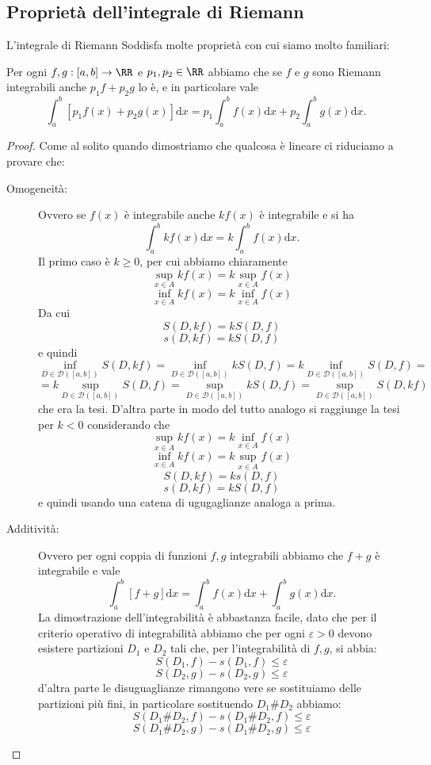 \documentclass[11pt]{scrartcl}
\newcommand{\dif}{\text{d}}
\begin{document}
	\subsection{Proprietà dell'integrale di Riemann}
	L'integrale di Riemann Soddisfa molte proprietà con cui siamo molto familiari:
	\begin{lemma}
		Per ogni $f,g:[a,b]\to\RR$ e $p_1,p_2\in \RR$ abbiamo che se $f$ e $g$ sono Riemann integrabili anche $p_1f+p_2g$ lo è, e in particolare vale
		$$\int_a^b\left[p_1f(x)+p_2g(x)\right]\dif x=p_1\int_a^bf(x)\dif x+p_2\int_a^b g(x)\dif x.$$
	\end{lemma}
	\begin{proof}
		Come al solito quando dimostriamo che qualcosa è lineare ci riduciamo a provare che:
		\begin{description}
			\item[Omogeneità:] Ovvero se $f(x)$ è integrabile anche $kf(x)$ è integrabile e si ha
			$$\int_a^bkf(x)\dif x=k\int_a^b f(x)\dif x.$$
			Il primo caso è $k\ge 0$, per cui abbiamo chiaramente
			$$\sup_{x\in A} kf(x)=k\sup_{x\in A}f(x)$$
			$$\inf_{x\in A} kf(x)=k\inf_{x\in A}f(x)$$
			Da cui
			$$S(D,kf)=kS(D,f)$$
			$$s(D,kf)=kS(D,f)$$
			e quindi
			$$\inf_{D\in \mathcal{D}([a,b])}S(D,kf)=\inf_{D\in \mathcal{D}([a,b])}kS(D,f)=k\inf_{D\in \mathcal{D}([a,b])}S(D,f)=$$
			$$=k\sup_{D\in \mathcal{D}([a,b])}S(D,f)=\sup_{D\in \mathcal{D}([a,b])}kS(D,f)=\sup_{D\in \mathcal{D}([a,b])}S(D,kf)$$
			che era la tesi. D'altra parte in modo del tutto analogo si raggiunge la tesi per $k<0$ considerando che 
			$$\sup_{x\in A} kf(x)=k\inf_{x\in A}f(x)$$
			$$\inf_{x\in A} kf(x)=k\sup_{x\in A}f(x)$$
			$$S(D,kf)=ks(D,f)$$
			$$s(D,kf)=kS(D,f)$$
			e quindi usando una catena di ugugaglianze analoga a prima.
			\item[Additività:] Ovvero per ogni coppia di funzioni $f,g$ integrabili abbiamo che $f+g$ è integrabile e vale
			$$\int_a^b \left[f+g\right]\dif x=\int_a^b f(x)\dif x+\int_a^b g(x)\dif x.$$
			La dimostrazione dell'integrabilità è abbastanza facile, dato che per il criterio operativo di integrabilità abbiamo che per ogni $\varepsilon>0$ devono esistere partizioni $D_1$ e $D_2$ tali che, per l'integrabilità di $f,g$, si abbia:
			$$S(D_1,f)-s(D_1,f)\le\varepsilon$$
			$$S(D_2,g)-s(D_2,g)\le\varepsilon$$
			d'altra parte le disuguaglianze rimangono vere se sostituiamo delle partizioni più fini, in particolare sostituendo $D_1\#D_2$ abbiamo:
			$$S(D_1\#D_2,f)-s(D_1\#D_2,f)\le\varepsilon$$
			$$S(D_1\#D_2,g)-s(D_1\#D_2,g)\le\varepsilon$$

\end{description}
\end{proof}
\end{document}
